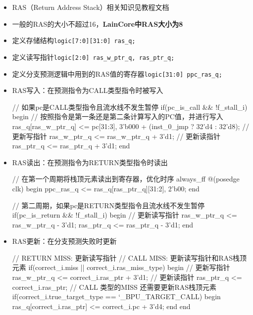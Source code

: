 \begin{itemize}
\item
  RAS（Return Address Stack）相关知识见教程文档
\item
  一般的RAS的大小不超过16，\textbf{LainCore中RAS大小为8}
\item
  定义存储结构\texttt{logic{[}7:0{]}{[}31:0{]}\ ras\_q;}
\item
  定义读写指针\texttt{logic{[}2:0{]}\ ras\_w\_ptr\_q,\ ras\_ptr\_q;}
\item
  定义分支预测逻辑中用到的RAS值的寄存器\texttt{logic{[}31:0{]}\ ppc\_ras\_q;}
\item
  RAS写入：在预测指令为CALL类型指令时被写入

\begin{CodeBlock}[language=BookSystemVerilog]
// 如果pc是CALL类型指令且流水线不发生暂停
if(pc_is_call && !f_stall_i) begin
  // 按照指令是第一条还是第二条计算写入的PC值，并进行写入
  ras_q[ras_w_ptr_q] <= {pc[31:3], 3'b000} + (inst_0_jmp ? 32'd4 : 32'd8);
  // 更新写指针
  ras_w_ptr_q <= ras_w_ptr_q + 3'd1;
  // 更新读指针
  ras_ptr_q <= ras_ptr_q + 3'd1;
end
\end{CodeBlock}
\item
  RAS读出：在预测指令为RETURN类型指令时读出

\begin{CodeBlock}[language=BookSystemVerilog]
// 在第一个周期将栈顶元素读出到寄存器，优化时序
always_ff @(posedge clk) begin
	ppc_ras_q <= {ras_q[ras_ptr_q][31:2], 2'b00};
end

// 第二周期，如果pc是RETURN类型指令且流水线不发生暂停
if(pc_is_return && !f_stall_i) begin
	// 更新读写指针
	ras_w_ptr_q <= ras_w_ptr_q - 3'd1;
	ras_ptr_q <= ras_ptr_q - 3'd1;
end
\end{CodeBlock}
\item
  RAS更新：在分支预测失败时更新

\begin{CodeBlock}[language=BookSystemVerilog]
// RETURN MISS: 更新读写指针
// CALL   MISS: 更新读写指针和RAS栈顶元素
if(correct_i.miss || correct_i.ras_miss_type) begin
  // 更新写指针
  ras_w_ptr_q <= correct_i.ras_ptr + 3'd1;
  // 更新读指针
  ras_ptr_q <= correct_i.ras_ptr;
  // CALL 类型的MISS 还需要更新RAS栈顶元素
  if(correct_i.true_target_type == `_BPU_TARGET_CALL) begin
    ras_q[correct_i.ras_ptr] <= correct_i.pc + 3'd4;
  end
end
\end{CodeBlock}
\end{itemize}

